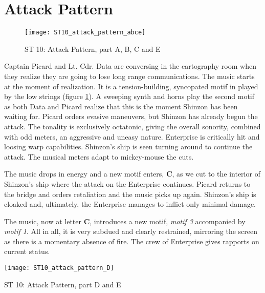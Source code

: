 \section{Attack Pattern}\label{sec:attack pattern}
\begin{figure}[h!]
\center
\texttt{[image: ST10\_attack\_pattern\_abce]}
	\caption{ST 10: Attack Pattern, part A, B, C and E}
	\label{ST10_attack_pattern_abce}
\end{figure}
\noindent Captain Picard and Lt. Cdr. Data are conversing in the cartography room when they realize they are going to lose long range communications. The music starts at the moment of realization. It is a tension-building, syncopated motif in  played by the low strings (figure \ref{ST10_attack_pattern_abce}). A sweeping synth and horns play the second motif as both Data and Picard realize that this is the moment Shinzon has been waiting for. Picard orders evasive maneuvers, but Shinzon has already begun the attack. The tonality is exclusively octatonic, giving the overall sonority, combined with odd meters, an aggressive and uneasy nature. Enterprise is critically hit and loosing warp capabilities. Shinzon's ship is seen turning around to continue the attack. The musical meters adapt to mickey-mouse the cuts. 

The music drops in energy and a new motif enters, \textbf{C}, as we cut to the interior of Shinzon's ship where the attack on the Enterprise continues. Picard returns to the bridge and orders retaliation and the music picks up again. Shinzon's ship is cloaked and, ultimately, the Enterprise manages to inflict only minimal damage. 

The music, now at letter \textbf{C}, introduces a new motif, \textit{motif 3} accompanied by \textit{motif 1}. All in all, it is very subdued and clearly restrained, mirroring the screen as there is a momentary absence of fire. The crew of Enterprise gives rapports on current status. 

\begin{marginfigure}
\texttt{[image: ST10\_attack\_pattern\_D]}
	\caption{ST 10: Attack Pattern, part D and E}
	\label{ST10_attack_pattern_D}
\end{marginfigure}

